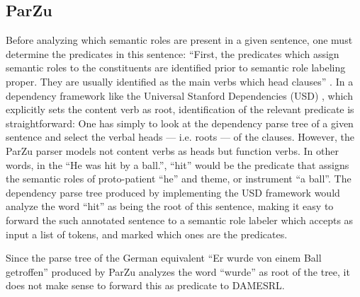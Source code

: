 \subsection{ParZu}


Before analyzing which semantic roles are present in a given sentence, one
must determine the predicates in this sentence: ``First, the predicates which
assign semantic roles to the constituents are identified prior to semantic
role labeling proper. They are usually identified as the main verbs which
head clauses'' \citep[p.~74]{samardzic2013dynamics}. In a dependency framework
like the Universal Stanford Dependencies (USD) \citep{de2014universal},
which explicitly sets the content verb as root, identification of the
relevant predicate is straightforward: One has simply to look at the dependency
parse tree of a given sentence and select the verbal heads --- i.e. roots ---
of the clauses. However, the ParZu parser models not content verbs as heads but
function verbs. In other words,
in the ``He was hit by a ball.'', ``hit'' would be the predicate that assigns
the semantic roles of proto-patient ``he'' and theme, or instrument ``a ball''.
The dependency parse tree produced by implementing the USD framework would
analyze the word ``hit'' as being the root of this sentence, making it easy to
forward the such annotated sentence to a semantic role labeler which accepts as
input a list of tokens, and marked which ones are the predicates.


Since the parse tree of the German equivalent ``Er wurde von einem Ball getroffen'' produced
by ParZu analyzes the word ``wurde'' as root of the tree, it does not make sense
to forward this as predicate to DAMESRL.



